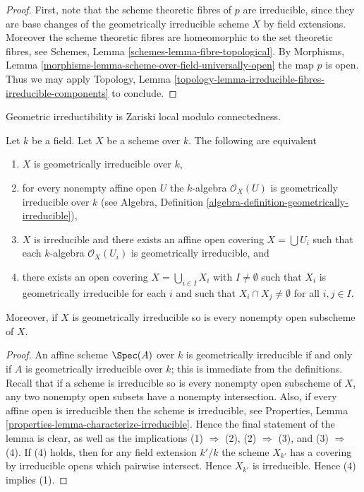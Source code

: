 \begin{proof}
First, note that the scheme theoretic fibres of $p$ are irreducible,
since they are base changes of the geometrically irreducible scheme $X$
by field extensions. Moreover the scheme theoretic fibres are
homeomorphic to the set theoretic fibres, see
Schemes, Lemma \ref{schemes-lemma-fibre-topological}.
By Morphisms, Lemma \ref{morphisms-lemma-scheme-over-field-universally-open}
the map $p$ is open.
Thus we may apply Topology,
Lemma \ref{topology-lemma-irreducible-fibres-irreducible-components}
to conclude.
\end{proof}

\begin{lemma}
\label{lemma-geometrically-irreducible-local}
\begin{slogan}
Geometric irreductibility is Zariski local modulo connectedness.
\end{slogan}
Let $k$ be a field. Let $X$ be a scheme over $k$.
The following are equivalent
\begin{enumerate}
\item $X$ is geometrically irreducible over $k$,
\item for every nonempty affine open $U$ the $k$-algebra $\mathcal{O}_X(U)$
is geometrically irreducible over $k$ (see
Algebra, Definition \ref{algebra-definition-geometrically-irreducible}),
\item $X$ is irreducible and there exists an affine open covering
$X = \bigcup U_i$ such that each $k$-algebra $\mathcal{O}_X(U_i)$ is
geometrically irreducible, and
\item there exists an open covering $X = \bigcup_{i \in I} X_i$
with $I \not = \emptyset$ such
that $X_i$ is geometrically irreducible for each $i$ and such that
$X_i \cap X_j \not = \emptyset$ for all $i, j \in I$.
\end{enumerate}
Moreover, if $X$ is geometrically irreducible so is every nonempty
open subscheme of $X$.
\end{lemma}

\begin{proof}
An affine scheme $\Spec(A)$ over $k$ is geometrically
irreducible if and only if $A$ is geometrically irreducible over $k$;
this is immediate from the definitions.
Recall that if a scheme is irreducible so is every nonempty
open subscheme of $X$, any two nonempty open subsets have
a nonempty intersection. Also, if every affine open is irreducible
then the scheme is irreducible, see Properties,
Lemma \ref{properties-lemma-characterize-irreducible}.
Hence the final statement of the lemma
is clear, as well as the implications (1) $\Rightarrow$ (2),
(2) $\Rightarrow$ (3), and (3) $\Rightarrow$ (4). If (4) holds,
then for any field extension $k'/k$ the scheme $X_{k'}$
has a covering by irreducible opens which pairwise intersect.
Hence $X_{k'}$ is irreducible. Hence (4) implies (1).
\end{proof}

